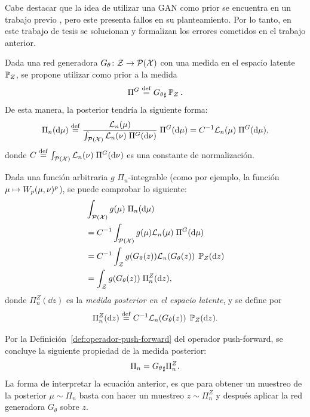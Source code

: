 Cabe destacar que la idea de utilizar una GAN como prior se encuentra en un trabajo previo \cite{patel2019bayesian}, pero este presenta fallos en su planteamiento. Por lo tanto, en este trabajo de tesis se solucionan y formalizan los errores cometidos en el trabajo anterior.

Dada una red generadora $G_\theta \colon \cZ \to \ProbSpace[\cX] $ con una medida en el espacio latente $\Prob_Z$, se propone utilizar como prior a la medida
\begin{equation}
    \Pi^G \eqdef \pf{G_\theta} \Prob_Z.
\end{equation}
De esta manera, la posterior tendría la siguiente forma:
\begin{equation}
    \Pi_n(\dd \mu)
    \eqdef \frac{\cL_n(\mu)}{\int_{\ProbSpace[\cX]} \cL_n(\nu) \; \Pi^G(\dd \nu)} \; \Pi^G(\dd \mu)
    = C^{-1} \cL_n(\mu) \; \Pi^G(\dd \mu),
\end{equation}
donde $C \eqdef \int_{\ProbSpace[\cX]} \cL_n(\nu) \; \Pi^G(\dd \nu)$ es una constante de normalización.

Dada una función arbitraria $g$ $\Pi_n$-integrable (como por ejemplo, la función $\mu \mapsto \Wasserstein[p]{\mu}{\nu}^p$), se puede comprobar lo siguiente:
\begin{align}\label{eq:posterior-en-latente-deduccion}
     & \int_{\ProbSpace[\cX]} g(\mu) \; \Pi_n(\dd \mu)                         \\
     & = C^{-1} \int_{\ProbSpace[\cX]} g(\mu) \cL_n(\mu) \; \Pi^G(\dd \mu)     \\
     & = C^{-1} \int_{\cZ} g(G_\theta(z)) \cL_n(G_\theta(z)) \; \Prob_Z(\dd z) \\
     & = \int_{\cZ} g(G_\theta(z)) \; \Pi^Z_n(\dd z),
\end{align}
donde $\Pi^Z_n(\dd z)$ es la \textit{medida posterior en el espacio latente}, y se define por
\begin{equation}
    \Pi^Z_n(\dd z) \eqdef C^{-1} \cL_n(G_\theta(z)) \; \Prob_Z(\dd z).
\end{equation}

Por la Definición~\ref{def:operador-push-forward} del operador push-forward, se concluye la siguiente propiedad de la medida posterior:
\begin{equation}\label{eq:posterior-en-latente}
    \Pi_n = \pf{G_\theta} \Pi^Z_n.
\end{equation}
La forma de interpretar la ecuación anterior, es que para obtener un muestreo de la posterior $\mu\sim\Pi_n$ basta con hacer un muestreo $z\sim\Pi^Z_n$ y después aplicar la red generadora $G_\theta$ sobre $z$.

